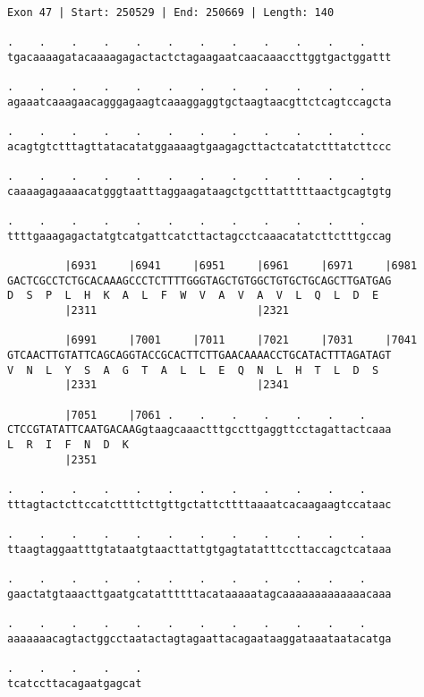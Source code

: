 \documentclass{article}
\begin{document}
\begin{Verbatim}[fontfamily=courier]
Exon 47 | Start: 250529 | End: 250669 | Length: 140

.    .    .    .    .    .    .    .    .    .    .    .    
tgacaaaagatacaaaagagactactctagaagaatcaacaaaccttggtgactggattt

.    .    .    .    .    .    .    .    .    .    .    .    
agaaatcaaagaacagggagaagtcaaaggaggtgctaagtaacgttctcagtccagcta

.    .    .    .    .    .    .    .    .    .    .    .    
acagtgtctttagttatacatatggaaaagtgaagagcttactcatatctttatcttccc

.    .    .    .    .    .    .    .    .    .    .    .    
caaaagagaaaacatgggtaatttaggaagataagctgctttatttttaactgcagtgtg

.    .    .    .    .    .    .    .    .    .    .    .    
ttttgaaagagactatgtcatgattcatcttactagcctcaaacatatcttctttgccag

         |6931     |6941     |6951     |6961     |6971     |6981
GACTCGCCTCTGCACAAAGCCCTCTTTTGGGTAGCTGTGGCTGTGCTGCAGCTTGATGAG
D  S  P  L  H  K  A  L  F  W  V  A  V  A  V  L  Q  L  D  E  
         |2311                         |2321                

         |6991     |7001     |7011     |7021     |7031     |7041
GTCAACTTGTATTCAGCAGGTACCGCACTTCTTGAACAAAACCTGCATACTTTAGATAGT
V  N  L  Y  S  A  G  T  A  L  L  E  Q  N  L  H  T  L  D  S  
         |2331                         |2341                

         |7051     |7061 .    .    .    .    .    .    .    
CTCCGTATATTCAATGACAAGgtaagcaaactttgccttgaggttcctagattactcaaa
L  R  I  F  N  D  K                                         
         |2351                                              

.    .    .    .    .    .    .    .    .    .    .    .    
tttagtactcttccatcttttcttgttgctattcttttaaaatcacaagaagtccataac

.    .    .    .    .    .    .    .    .    .    .    .    
ttaagtaggaatttgtataatgtaacttattgtgagtatatttccttaccagctcataaa

.    .    .    .    .    .    .    .    .    .    .    .    
gaactatgtaaacttgaatgcatattttttacataaaaatagcaaaaaaaaaaaaacaaa

.    .    .    .    .    .    .    .    .    .    .    .    
aaaaaaacagtactggcctaatactagtagaattacagaataaggataaataatacatga

.    .    .    .    .
tcatccttacagaatgagcat
\end{Verbatim}
\newpage
\end{document}
